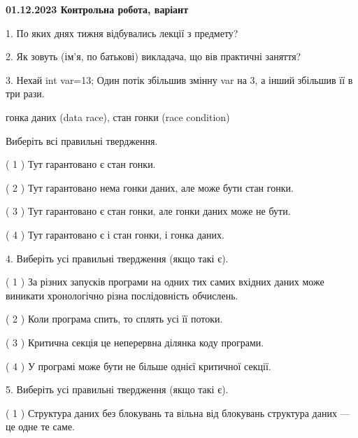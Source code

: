 \documentclass[12pt, ukrainian]{article}
\begin{document}
\vspace{4mm}
\newpage
\begin {large}

\textbf{01.12.2023 Контрольна робота, варіант  }\par


{
1. По яких днях тижня відбувались лекції з предмету?



\vspace{5mm}
2. Як зовуть (ім'я, по батькові) викладача, що вів практичні заняття?



\vspace{5mm}
3. Нехай int var=13; Один потік збільшив змінну var на 3, а інший збільшив її в три рази.

гонка даних (data race), стан гонки (race condition)

Виберіть всі правильні твердження.\par
\vspace{2mm}
( 1 ) Тут гарантовано є стан гонки.%

( 2 ) Тут гарантовано нема гонки даних, але може бути стан гонки.%

( 3 ) Тут гарантовано є стан гонки, але гонки даних може не бути.%

( 4 ) Тут гарантовано є і стан гонки, і гонка даних.%


\vspace{5mm}
4. Виберіть усі правильні твердження (якщо такі є).\par
\vspace{2mm}

( 1 ) За різних запусків програми на одних тих самих вхідних даних може виникати хронологічно різна послідовність обчислень.%

( 2 ) Коли програма спить, то сплять усі її потоки.%

( 3 ) Критична секція це неперервна ділянка коду програми.%

( 4 ) У програмі може бути не більше однієї критичної секції.%


\vspace{5mm}
5. Виберіть усі правильні твердження (якщо такі є).\par
\vspace{2mm}

( 1 ) Структура даних без блокувань та вільна від блокувань структура даних --- це одне те саме.%

}
\end{large}
\end{document}
